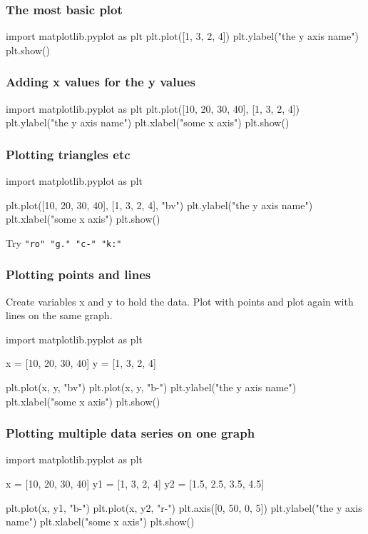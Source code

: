 \documentclass{beamer}
\begin{document}
\begin{frame}[fragile]
\frametitle{The most basic plot}
\begin{code}
import matplotlib.pyplot as plt
plt.plot([1, 3, 2, 4])
plt.ylabel("the y axis name")
plt.show()
\end{code}
\end{frame}

\begin{frame}[fragile]
\frametitle{Adding x values for the y values}
\begin{code}
import matplotlib.pyplot as plt
plt.plot([10, 20, 30, 40], [1, 3, 2, 4])
plt.ylabel("the y axis name")
plt.xlabel("some x axis")
plt.show()
\end{code}
\end{frame}

\begin{frame}[fragile]
\frametitle{Plotting triangles etc}
\begin{code}
import matplotlib.pyplot as plt

plt.plot([10, 20, 30, 40], [1, 3, 2, 4], "bv")
plt.ylabel("the y axis name")
plt.xlabel("some x axis")
plt.show()
\end{code}

\bigskip

Try \texttt{"ro" "g." "c-" "k:"}
\end{frame}

\begin{frame}[fragile]
\frametitle{Plotting points and lines}
Create variables x and y to hold the data. Plot with points and plot
again with lines on the same graph.
\begin{code}
import matplotlib.pyplot as plt

x = [10, 20, 30, 40]
y = [1, 3, 2, 4]

plt.plot(x, y, "bv")
plt.plot(x, y, "b-")
plt.ylabel("the y axis name")
plt.xlabel("some x axis")
plt.show()
\end{code}
\end{frame}

\begin{frame}[fragile]
\frametitle{Plotting multiple data series on one graph}
\begin{code}
import matplotlib.pyplot as plt

x = [10, 20, 30, 40]
y1 = [1, 3, 2, 4]
y2 = [1.5, 2.5, 3.5, 4.5]

plt.plot(x, y1, "b-") 
plt.plot(x, y2, "r-")
plt.axis([0, 50, 0, 5])
plt.ylabel("the y axis name")
plt.xlabel("some x axis")
plt.show()
\end{code}
\end{frame}
\end{document}
